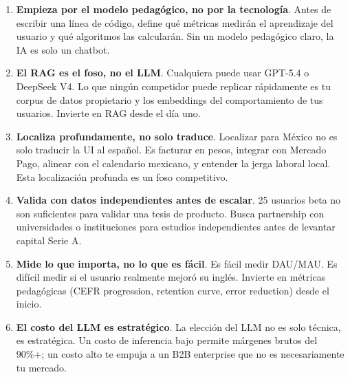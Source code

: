 \begin{enumerate}[leftmargin=1.6em]
\item \textbf{Empieza por el modelo pedagógico, no por la tecnología}. Antes de escribir una línea de código, define qué métricas medirán el aprendizaje del usuario y qué algoritmos las calcularán. Sin un modelo pedagógico claro, la IA es solo un chatbot.

\item \textbf{El RAG es el foso, no el LLM}. Cualquiera puede usar GPT-5.4 o DeepSeek V4. Lo que ningún competidor puede replicar rápidamente es tu corpus de datos propietario y los embeddings del comportamiento de tus usuarios. Invierte en RAG desde el día uno.

\item \textbf{Localiza profundamente, no solo traduce}. Localizar para México no es solo traducir la UI al español. Es facturar en pesos, integrar con Mercado Pago, alinear con el calendario mexicano, y entender la jerga laboral local. Esta localización profunda es un foso competitivo.

\item \textbf{Valida con datos independientes antes de escalar}. 25 usuarios beta no son suficientes para validar una tesis de producto. Busca partnership con universidades o instituciones para estudios independientes antes de levantar capital Serie A.

\item \textbf{Mide lo que importa, no lo que es fácil}. Es fácil medir DAU/MAU. Es difícil medir si el usuario realmente mejoró su inglés. Invierte en métricas pedagógicas (CEFR progression, retention curve, error reduction) desde el inicio.

\item \textbf{El costo del LLM es estratégico}. La elección del LLM no es solo técnica, es estratégica. Un costo de inferencia bajo permite márgenes brutos del 90\%+; un costo alto te empuja a un B2B enterprise que no es necesariamente tu mercado.
\end{enumerate}

